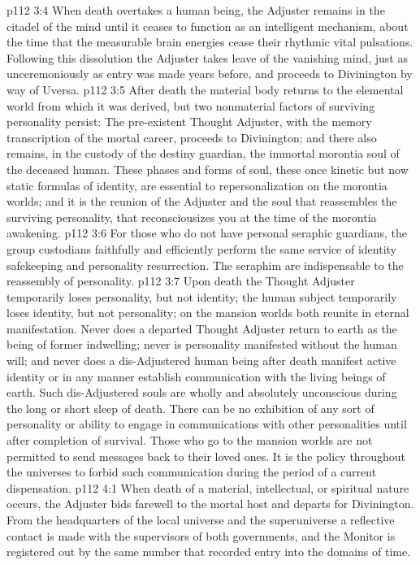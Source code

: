 \vs p112 3:4 \bibnobreakspace {} When death overtakes a human being, the Adjuster remains in the citadel of the mind until it ceases to function as an intelligent mechanism, about the time that the measurable brain energies cease their rhythmic vital pulsations. Following this dissolution the Adjuster takes leave of the vanishing mind, just as unceremoniously as entry was made years before, and proceeds to Divinington by way of Uversa.
\vs p112 3:5 \pc After death the material body returns to the elemental world from which it was derived, but two nonmaterial factors of surviving personality persist: The pre\hyp{}existent Thought Adjuster, with the memory transcription of the mortal career, proceeds to Divinington; and there also remains, in the custody of the destiny guardian, the immortal morontia soul of the deceased human. These phases and forms of soul, these once kinetic but now static formulas of identity, are essential to repersonalization on the morontia worlds; and it is the reunion of the Adjuster and the soul that reassembles the surviving personality, that reconsciousizes you at the time of the morontia awakening.
\vs p112 3:6 For those who do not have personal seraphic guardians, the group custodians faithfully and efficiently perform the same service of identity safekeeping and personality resurrection. The seraphim are indispensable to the reassembly of personality.
\vs p112 3:7 Upon death the Thought Adjuster temporarily loses personality, but not identity; the human subject temporarily loses identity, but not personality; on the mansion worlds both reunite in eternal manifestation. Never does a departed Thought Adjuster return to earth as the being of former indwelling; never is personality manifested without the human will; and never does a dis\hyp{}Adjustered human being after death manifest active identity or in any manner establish communication with the living beings of earth. Such dis\hyp{}Adjustered souls are wholly and absolutely unconscious during the long or short sleep of death. There can be no exhibition of any sort of personality or ability to engage in communications with other personalities until after completion of survival. Those who go to the mansion worlds are not permitted to send messages back to their loved ones. It is the policy throughout the universes to forbid such communication during the period of a current dispensation.
\vs p112 4:1 When death of a material, intellectual, or spiritual nature occurs, the Adjuster bids farewell to the mortal host and departs for Divinington. From the headquarters of the local universe and the superuniverse a reflective contact is made with the supervisors of both governments, and the Monitor is registered out by the same number that recorded entry into the domains of time.
